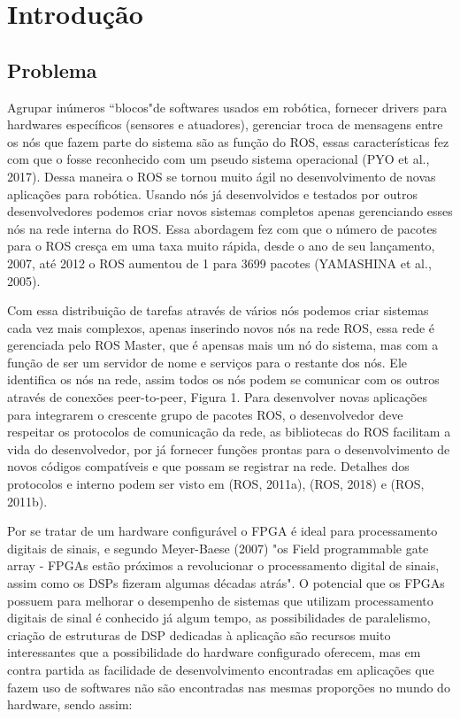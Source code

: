 \chapter{Introdução}

\section{Problema}

Agrupar inúmeros “blocos"de softwares usados em robótica, fornecer drivers para
hardwares específicos (sensores e atuadores), gerenciar troca de mensagens entre os nós
que fazem parte do sistema são as função do ROS, essas características fez com que o
fosse reconhecido com um pseudo sistema operacional (PYO et al., 2017). Dessa maneira o
ROS se tornou muito ágil no desenvolvimento de novas aplicações para robótica. Usando
nós já desenvolvidos e testados por outros desenvolvedores podemos criar novos sistemas
completos apenas gerenciando esses nós na rede interna do ROS. Essa abordagem fez com
que o número de pacotes para o ROS cresça em uma taxa muito rápida, desde o ano de
seu lançamento, 2007, até 2012 o ROS aumentou de 1 para 3699 pacotes (YAMASHINA
et al., 2005).

Com essa distribuição de tarefas através de vários nós podemos criar sistemas cada
vez mais complexos, apenas inserindo novos nós na rede ROS, essa rede é gerenciada
pelo ROS Master, que é apensas mais um nó do sistema, mas com a função de ser um
servidor de nome e serviços para o restante dos nós. Ele identifica os nós na rede, assim
todos os nós podem se comunicar com os outros através de conexões peer-to-peer, Figura
1. Para desenvolver novas aplicações para integrarem o crescente grupo de pacotes ROS, o
desenvolvedor deve respeitar os protocolos de comunicação da rede, as bibliotecas do ROS
facilitam a vida do desenvolvedor, por já fornecer funções prontas para o desenvolvimento
de novos códigos compatíveis e que possam se registrar na rede. Detalhes dos protocolos e
interno podem ser visto em (ROS, 2011a), (ROS, 2018) e (ROS, 2011b).

Por se tratar de um hardware configurável o FPGA é ideal para processamento
digitais de sinais, e segundo Meyer-Baese (2007) "os Field programmable gate array -
FPGAs estão próximos a revolucionar o processamento digital de sinais, assim como os
DSPs fizeram algumas décadas atrás". O potencial que os FPGAs possuem para melhorar o 
desempenho de sistemas que utilizam processamento digitais de sinal é conhecido já algum
tempo, as possibilidades de paralelismo, criação de estruturas de DSP dedicadas à aplicação
são recursos muito interessantes que a possibilidade do hardware configurado oferecem,
mas em contra partida as facilidade de desenvolvimento encontradas em aplicações que
fazem uso de softwares não são encontradas nas mesmas proporções no mundo do hardware,
sendo assim:

